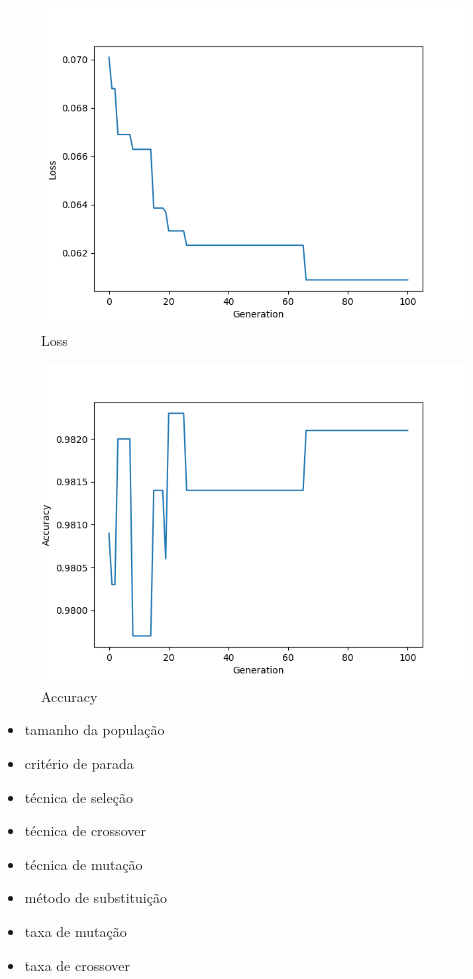 \documentclass[twoside,conference,a4paper]{IEEEtran}
\begin{document}
\begin{figure}[htbp]
        \centering \includegraphics[width=1\columnwidth]{./imgs/01_mnist_auto.png}
        \caption{
                \label{fig:loss_mnist_auto_01}
                Loss
        }
\end{figure}
\begin{figure}[htbp]
        \centering \includegraphics[width=1\columnwidth]{./imgs/01_mnist_auto_acc.png}
        \caption{
                \label{fig:acc_mnist_auto_01}
                Accuracy
        }
\end{figure}

\begin{itemize}
    \item tamanho da população
    \item critério de parada
    \item técnica de seleção
    \item técnica de crossover
    \item técnica de mutação
    \item método de substituição
    \item taxa de mutação
    \item taxa de crossover
\end{itemize}
\end{document}
